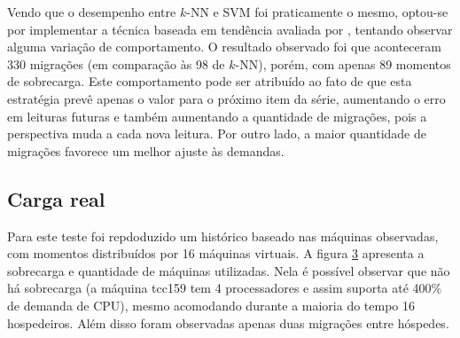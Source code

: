 \begin{figure}[htp]
\centering
{}
\label{fig:cpuhost0}
\end{figure}

Vendo que o desempenho entre $k$-NN e SVM foi praticamente o mesmo, optou-se por
implementar a técnica baseada em tendência avaliada por
, tentando observar alguma variação de
comportamento. O resultado observado foi que aconteceram 330 migrações (em
comparação às 98 de $k$-NN), porém, com apenas 89 momentos de sobrecarga. Este
comportamento pode ser atribuído ao fato de que esta estratégia prevê apenas o
valor para o próximo item da série, aumentando o erro em leituras futuras e
também aumentando a quantidade de migrações, pois a perspectiva muda a cada nova
leitura. Por outro lado, a maior quantidade de migrações favorece um melhor
ajuste às demandas.

\begin{figure}[htp]
\centering
{}
\label{fig:cpuhost0}
\end{figure}

\subsection{Carga real}

Para este teste foi repdoduzido um histórico baseado nas máquinas observadas,
com momentos distribuídos por 16 máquinas virtuais. A figura \ref{fig:cpuhost1}
apresenta a sobrecarga e quantidade de máquinas utilizadas. Nela é possível
observar que não há sobrecarga (a máquina tcc159 tem 4 processadores e assim
suporta até 400\% de demanda de CPU), mesmo acomodando durante a maioria do
tempo 16 hospedeiros. Além disso foram observadas apenas duas migrações entre
hóspedes.

\begin{figure}[htp]
\centering
{}
\label{fig:cpuhost1}
\end{figure}


